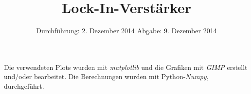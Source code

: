 
\usepackage{marvosym}
\subject{Anfängerpraktikum V303}
\title{Lock-In-Verstärker
}
\date{
  Durchführung: 2. Dezember 2014
  \hspace{1em}
  Abgabe: 9. Dezember 2014
}


\maketitle
\thispagestyle{empty}
\newpage





\printbibliography
\noindent Die verwendeten Plots wurden mit \textit{matplotlib}\cite{matplotlib} und die Grafiken mit \textit{GIMP}\cite{gimp} erstellt und/oder bearbeitet.
Die Berechnungen wurden mit Python-\textit{Numpy}, \cite{numpy} durchgeführt.

